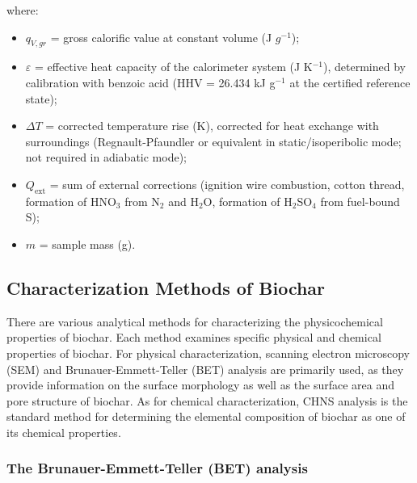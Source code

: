where:
\begin{itemize}
    \item $q_{V,gr}$ = gross calorific value at constant volume (J $g^{-1}$);
    \item $\varepsilon$ = effective heat capacity of the calorimeter system (J K$^{-1}$), determined by calibration with benzoic acid (HHV = 26.434 kJ g$^{-1}$ at the certified reference state);
    \item $\Delta T$ = corrected temperature rise (K), corrected for heat exchange with surroundings (Regnault-Pfaundler or equivalent in static/isoperibolic mode; not required in adiabatic mode);
    \item $Q_{\mathrm{ext}}$ = sum of external corrections (ignition wire combustion, cotton thread, formation of HNO$_3$ from N$_2$ and H$_2$O, formation of H$_2$SO$_4$ from fuel-bound S);
    \item $m$ = sample mass (g).
\end{itemize}

\subsection{Characterization Methods of Biochar}
\label{subsec:characterisation-methods}
There are various analytical methods for characterizing the physicochemical properties of biochar. Each method examines specific physical and chemical properties of biochar. For physical characterization, scanning electron microscopy (SEM) and Brunauer-Emmett-Teller (BET) analysis are primarily used, as they provide information on the surface morphology as well as the surface area and pore structure of biochar. As for chemical characterization, CHNS analysis is the standard method for determining the elemental composition of biochar as one of its chemical properties.


\subsubsection*{The Brunauer-Emmett-Teller (BET) analysis}

